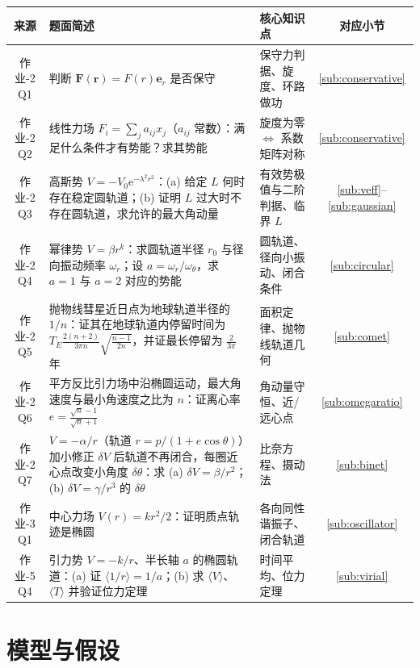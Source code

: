 \documentclass[UTF8,a4paper,11pt]{ctexart}
\begin{document}
\begin{center}
\small
\begin{tabular}{cp{5.5cm}p{3.7cm}c}
\toprule
来源 & 题面简述 & 核心知识点 & 对应小节 \\
\midrule
作业-2 Q1 & 判断 $\boldsymbol{F}(\boldsymbol{r})=F(r)\boldsymbol{e}_r$ 是否保守 &
  保守力判据、旋度、环路做功 & \ref{sub:conservative} \\
作业-2 Q2 & 线性力场 $F_i=\sum_j a_{ij}x_j$（$a_{ij}$ 常数）：满足什么条件才有势能？求其势能 &
  旋度为零 $\Leftrightarrow$ 系数矩阵对称 & \ref{sub:conservative} \\
作业-2 Q3 & 高斯势 $V=-V_0\mathrm{e}^{-\lambda^2r^2}$：(a) 给定 $L$ 何时存在稳定圆轨道；(b) 证明 $L$ 过大时不存在圆轨道，求允许的最大角动量 &
  有效势极值与二阶判据、临界 $L$ & \ref{sub:veff}--\ref{sub:gaussian} \\
作业-2 Q4 & 幂律势 $V=\beta r^k$：求圆轨道半径 $r_0$ 与径向振动频率 $\omega_r$；设 $a=\omega_r/\omega_\theta$，求 $a=1$ 与 $a=2$ 对应的势能 &
  圆轨道、径向小振动、闭合条件 & \ref{sub:circular} \\
作业-2 Q5 & 抛物线彗星近日点为地球轨道半径的 $1/n$：证其在地球轨道内停留时间为
  $T_E\frac{2(n+2)}{3\pi n}\sqrt{\frac{n-1}{2n}}$，并证最长停留为 $\frac{2}{3\pi}$ 年 &
  面积定律、抛物线轨道几何 & \ref{sub:comet} \\
作业-2 Q6 & 平方反比引力场中沿椭圆运动，最大角速度与最小角速度之比为 $n$：证离心率 $e=\frac{\sqrt n-1}{\sqrt n+1}$ &
  角动量守恒、近/远心点 & \ref{sub:omegaratio} \\
作业-2 Q7 & $V=-\alpha/r$（轨道 $r=p/(1+e\cos\theta)$）加小修正 $\delta V$ 后轨道不再闭合，每圈近心点改变小角度 $\delta\theta$：求 (a) $\delta V=\beta/r^2$；(b) $\delta V=\gamma/r^3$ 的 $\delta\theta$ &
  比奈方程、摄动法 & \ref{sub:binet} \\
作业-3 Q1 & 中心力场 $V(r)=kr^2/2$：证明质点轨迹是椭圆 &
  各向同性谐振子、闭合轨道 & \ref{sub:oscillator} \\
作业-5 Q4 & 引力势 $V=-k/r$、半长轴 $a$ 的椭圆轨道：(a) 证 $\langle 1/r\rangle=1/a$；(b) 求 $\langle V\rangle$、$\langle T\rangle$ 并验证位力定理 &
  时间平均、位力定理 & \ref{sub:virial} \\
\bottomrule
\end{tabular}
\end{center}

\section{模型与假设}
\label{sec:model}
\end{document}
